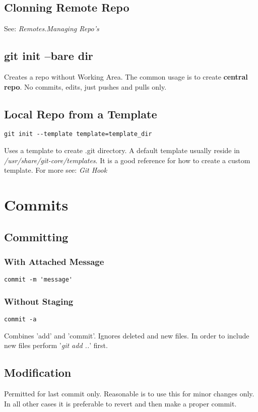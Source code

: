 \documentclass{report}
\begin{document}
\section{Clonning Remote Repo}
See: \textit{Remotes.Managing Repo's}


\section{git init --bare dir}
Creates a repo without Working Area. The common usage is  to create \textbf{central repo}.
No commits, edits, just pushes and pulls only.


\section{Local Repo from a Template}
\begin{verbatim}
git init --template template=template_dir
\end{verbatim}
Uses a template to create .git directory. A default template usually reside in \textit{/usr/share/git-core/templates}. It is
a good reference for how to create a custom template. For more see: \textit{Git Hook}



\chapter{Commits}


\section{Committing}

\subsection{With Attached Message}
\begin{verbatim}
commit -m 'message'
\end{verbatim}

\subsection{Without Staging}
\begin{verbatim}
commit -a
\end{verbatim}
Combines 'add' and 'commit'. Ignores deleted and new files. In order to include new files perform '\textit{git add ..}' first.


\section{Modification}
Permitted for last commit only. Reasonable is to use this for minor changes only. In all other cases it is preferable to revert and then make a proper commit.
\end{document}
